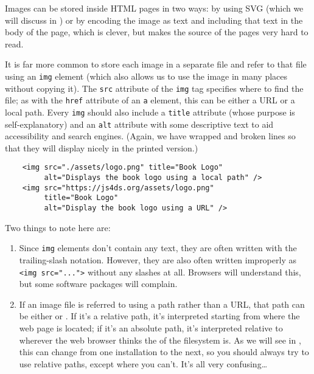 Images can be stored inside HTML pages in two ways:
by using SVG (which we will discuss in )
or by encoding the image as text and including that text in the body of the page,
which is clever,
but makes the source of the pages very hard to read.

It is far more common to store each image in a separate file
and refer to that file using an \texttt{img} element
(which also allows us to use the image in many places without copying it).
The \texttt{src} attribute of the \texttt{img} tag specifies where to find the file;
as with the \texttt{href} attribute of an \texttt{a} element,
this can be either a URL or a local path.
Every \texttt{img} should also include a \texttt{title} attribute (whose purpose is self-explanatory)
and an \texttt{alt} attribute with some descriptive text to aid accessibility and search engines.
(Again, we have wrapped and broken lines so that they will display nicely in the printed version.)

\begin{verbatim}
    <img src="./assets/logo.png" title="Book Logo"
         alt="Displays the book logo using a local path" />
    <img src="https://js4ds.org/assets/logo.png"
         title="Book Logo"
         alt="Display the book logo using a URL" />
\end{verbatim}

Two things to note here are:

\begin{enumerate}
\item
  Since \texttt{img} elements don't contain any text,
  they are often written with the trailing-slash notation.
  However,
  they are also often written improperly as \texttt{{\textless}img\ src="..."{\textgreater}} without any slashes at all.
  Browsers will understand this,
  but some software packages will complain.
\item
  If an image file is referred to using a path rather than a URL,
  that path can be either 
  or .
  If it's a relative path,
  it's interpreted starting from where the web page is located;
  if it's an absolute path,
  it's interpreted relative to wherever the web browser thinks
  the  of the filesystem is.
  As we will see in ,
  this can change from one installation to the next,
  so you should always try to use relative paths,
  except where you can't.
  It's all very confusing{\ldots}
\end{enumerate}

